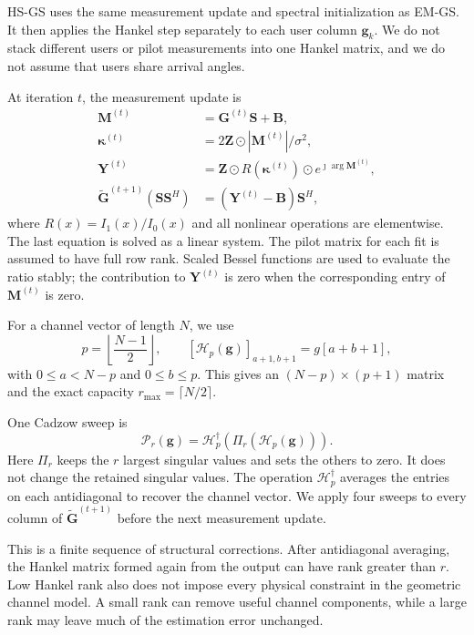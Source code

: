 \documentclass[11pt,a4paper]{article}
\begin{document}
HS-GS uses the same measurement update and spectral initialization as
EM-GS. It then applies the Hankel step separately to each user column
$\mathbf g_k$. We do not stack different users or pilot measurements into
one Hankel matrix, and we do not assume that users share arrival angles.

At iteration $t$, the measurement update is
\begin{align}
\mathbf M^{(t)}&=\mathbf G^{(t)}\mathbf S+\mathbf B,\\
\boldsymbol\kappa^{(t)}&=
  2\mathbf Z\odot|\mathbf M^{(t)}|/\sigma^2,\\
\mathbf Y^{(t)}&=\mathbf Z\odot R(\boldsymbol\kappa^{(t)})
  \odot e^{\jmath\arg\mathbf M^{(t)}},\\
\widetilde{\mathbf G}^{(t+1)}(\mathbf S\mathbf S^H)
  &=(\mathbf Y^{(t)}-\mathbf B)\mathbf S^H,
\label{eq:revision-em-update}
\end{align}
where $R(x)=I_1(x)/I_0(x)$ and all nonlinear operations are elementwise.
The last equation is solved as a linear system. The pilot matrix for each
fit is assumed to have full row rank. Scaled Bessel functions are used to
evaluate the ratio stably; the contribution to $\mathbf Y^{(t)}$ is zero
when the corresponding entry of $\mathbf M^{(t)}$ is zero.

For a channel vector of length $N$, we use
\begin{equation}
p=\left\lfloor\frac{N-1}{2}\right\rfloor,
\qquad
[\mathcal H_p(\mathbf g)]_{a+1,b+1}=g[a+b+1],
\end{equation}
with $0\leq a<N-p$ and $0\leq b\leq p$. This gives an
$(N-p)\times(p+1)$ matrix and the exact capacity
$r_{\max}=\lceil N/2\rceil$.

One Cadzow sweep is
\begin{equation}
\mathcal P_r(\mathbf g)=
\mathcal H_p^\dagger\!\left(\Pi_r(\mathcal H_p(\mathbf g))\right).
\label{eq:revision-cadzow}
\end{equation}
Here $\Pi_r$ keeps the $r$ largest singular values and sets the others to
zero. It does not change the retained singular values. The operation
$\mathcal H_p^\dagger$ averages the entries on each antidiagonal to recover
the channel vector. We apply four sweeps to every column of
$\widetilde{\mathbf G}^{(t+1)}$ before the next measurement update.

This is a finite sequence of structural corrections. After antidiagonal
averaging, the Hankel matrix formed again from the output can have rank
greater than $r$. Low Hankel rank also does not impose every physical
constraint in the geometric channel model. A small rank can remove useful
channel components, while a large rank may leave much of the estimation
error unchanged.
\end{document}
